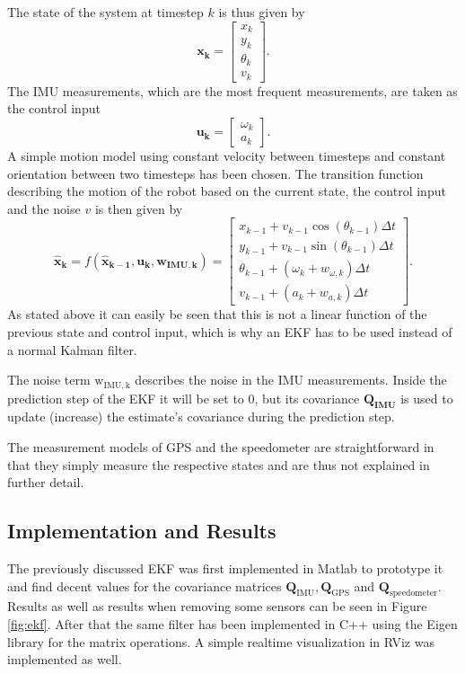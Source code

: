 \documentclass[11pt,a4paper]{article}
\begin{document}
	The state of the system at timestep $k$ is thus given by
	\begin{equation}
	    \mathbf{x_k}=\begin{bmatrix}
	        x_k\\
	        y_k\\
	        \theta_k \\
	        v_k
	    \end{bmatrix}.
	\end{equation}
	The IMU measurements, which are the most frequent measurements, are taken as the control input
	\begin{equation}
	    \mathbf{u_k}=\begin{bmatrix}
	        \omega_k \\
	        a_k
	    \end{bmatrix}.
	\end{equation}
	A simple motion model using constant velocity between timesteps and constant orientation between two timesteps has been chosen. The transition function describing the motion of the robot based on the current state, the control input and the noise $v$ is then given by
	\begin{equation}
	    \mathbf{\hat{x}_k}=f(\mathbf{\hat{x}_{k-1}},\mathbf{u_k},\mathbf{w_{IMU,k}})=
	    \begin{bmatrix}
	        x_{k-1}+v_{k-1}\cos{(\theta_{k-1})}\Delta t \\
	        y_{k-1}+v_{k-1}\sin{(\theta_{k-1})}\Delta t \\
	        \theta_{k-1}+(\omega_k+w_{\omega,k})\Delta t \\
	        v_{k-1}+(a_k+w_{a,k})\Delta t
	    \end{bmatrix}.
	\end{equation}
	As stated above it can easily be seen that this is not a linear function of the previous state and control input, which is why an EKF has to be used instead of a normal Kalman filter.
	
	The noise term $\mathrm{w_{IMU,k}}$ describes the noise in the IMU measurements. Inside the prediction step of the EKF it will be set to 0, but its covariance $\mathbf{Q_{IMU}}$ is used to update (increase) the estimate's covariance during the prediction step.
	
	The measurement models of GPS and the speedometer are straightforward in that they simply measure the respective states and are thus not explained in further detail.
	
	\subsection{Implementation and Results}
	The previously discussed EKF was first implemented in Matlab to prototype it and find decent values for the covariance matrices $\mathbf{Q_\mathrm{IMU}}, \mathbf{Q_\mathrm{GPS}}$ and $\mathbf{Q_\mathrm{speedometer}}$. Results as well as results when removing some sensors can be seen in Figure \ref{fig:ekf}. After that the same filter has been implemented in C++ using the Eigen library for the matrix operations. A simple realtime visualization in RViz was implemented as well.
	
\end{document}
